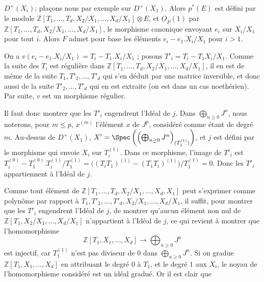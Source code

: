 
\(D^+(X_i)\); plaçons nous par exemple sur \(D^+(X_1)\). Alors \(p^*(\underline{E})\) est défini par le module \(\mathbb Z[T_1,\ldots,T_d,X_2/X_1,\ldots,X_d/X_1]\otimes E\), et \(\underline{O}_P(1)\) par \(\mathbb Z[T_1,\ldots,T_d,X_2/X_1,\ldots,X_d/X_1]\), le morphisme canonique envoyant \(e_i\) sur \(X_i/X_1\) pour tout \(i\). Alors \(F\) admet pour base les éléments \(e_i-e_1.X_i/X_1\) pour \(i>1\).

On a \(v(e_i-e_1.X_i/X_1)=T_i-T_1.X_i/X_1\) ; posons \(T'_i=T_i-T_1X_i/X_1\).
Comme la suite des \(T_i\) est régulière dans \(\mathbb Z[T_1,\ldots,T_d,X_2/X_1,\ldots,X_d/X_1]\), il en est de même de la suite \(T_1,T'_2,\ldots,T'_d\) qui s'en déduit par une matrice inversible, et donc aussi de la suite \(T'_2,\ldots,T'_d\) qui en est extraite (on est dans un cas noethérien). Par suite, \(v\) est un morphisme régulier.

Il faut donc montrer que les \(T'_i\) engendrent l'Idéal de \(j\). Dans \(\bigoplus_{n\ge0}J^n\), nous noterons, pour \(m\le p\), \(x^{(m)}\) l'élément \(x\) de \(J^p\), considéré comme étant de degré \(m\). Au-dessus de \(D^+(X_1)\), \(X'=\Spec\left(\left(\bigoplus_{n\ge0}J^n\right)_{(T_1^{(1)})}\right)\), et \(j\) est défini par le morphisme qui envoie \(X_i\) sur \(T_i^{(1)}\). Dans ce morphisme, l'image de \(T'_i\) est \(T_i^{(0)}-T_1^{(0)}.T_i^{(1)}/T_1^{(1)}=\bigl((T_iT_1)^{(1)}-(T_1T_i)^{(1)}\bigr)/T_1^{(1)}=0\). Donc les \(T'_i\) appartiennent à l'Idéal de \(j\).

Comme tout élément de \(\mathbb Z[T_1,\ldots,T_d,X_2/X_1,\ldots,X_d,X_1]\) peut s'exprimer comme polynôme par rapport à \(T_1,T'_2,\ldots,T'_d,X_2/X_1,\ldots,X_d/X_1\), il suffit, pour montrer que les \(T'_i\) engendrent l'Idéal de \(j\), de montrer qu'aucun élément non nul de \(\mathbb Z[T_1,X_2/X_1,\ldots,X_d/X_1]\) n'appartient à l'Idéal de \(j\), ce qui revient à montrer que l'homomorphisme
\[
\mathbb Z[T_1,X_1,\ldots,X_d]\longrightarrow\bigoplus_{n\ge0}J^n
\]
est injectif, car \(T_1^{(1)}\) n'est pas diviseur de 0 dans \(\bigoplus_{n\ge0}J^n\). Si on gradue \(\mathbb Z[T_1,X_1,\ldots,X_d]\) en attribuant le degré \(0\) à \(T_1\), et le degré \(1\) aux \(X_i\), le noyau de l'homomorphisme considéré est un idéal gradué. Or il est clair que
